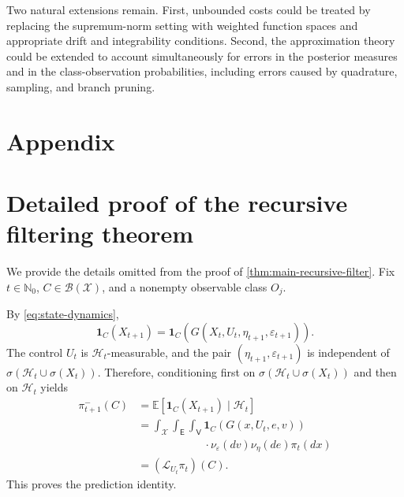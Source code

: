 \documentclass[10pt,twocolumn]{article}
\theoremstyle{remark}
\newcommand{\N}{\mathbb{N}}
\newcommand{\E}{\mathbb{E}}
\newcommand{\B}{\mathcal{B}}
\newcommand{\Hh}{\mathcal{H}}
\newcommand{\Xcal}{\mathcal{X}}
\newcommand{\one}{\mathbf{1}}
\begin{document}
Two natural extensions remain. First, unbounded costs could be treated by replacing the supremum-norm setting with weighted function spaces and appropriate drift and integrability conditions. Second, the approximation theory could be extended to account simultaneously for errors in the posterior measures and in the class-observation probabilities, including errors caused by quadrature, sampling, and branch pruning.


%
%




\appendix
\section*{Appendix}
\section{Detailed proof of the recursive filtering theorem}
\label{app:recursive-filter-proof}

We provide the details omitted from the proof of \cref{thm:main-recursive-filter}. Fix \(t\in\N_0\), \(C\in\B(\Xcal)\), and a nonempty observable class \(O_j\).

By \cref{eq:state-dynamics},
\[
\one_C(X_{t+1})
=
\one_C\!\left(G(X_t,U_t,\eta_{t+1},\varepsilon_{t+1})\right).
\]
The control \(U_t\) is \(\Hh_t\)-measurable, and the pair \((\eta_{t+1},\varepsilon_{t+1})\) is independent of \(\sigma(\Hh_t\cup\sigma(X_t))\). Therefore, conditioning first on \(\sigma(\Hh_t\cup\sigma(X_t))\) and then on \(\Hh_t\) yields
\begin{align*}
	\pi_{t+1}^{-}(C)
	&=\E[\one_C(X_{t+1})\mid\Hh_t]\\
	&=\int_{\Xcal}\int_{\mathsf E}\int_{\mathsf V}
	\one_C\!\left(G(x,U_t,e,v)\right)\\
	& \qquad \qquad \qquad 
	\cdot \nu_\varepsilon(dv)\nu_\eta(de)\pi_t(dx)\\
	&=(\mathcal L_{U_t}\pi_t)(C).
\end{align*}
This proves the prediction identity.
\end{document}
